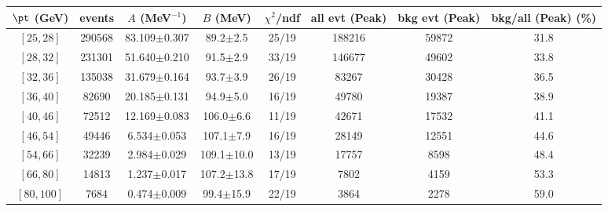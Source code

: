\begin{tabular}{c|c||c|c|c||c|c|c}
$\pt$ (GeV) & events & $A$ (MeV$^{-1}$) & $B$ (MeV)  & $\chi^2$/ndf & all evt (Peak) & bkg evt (Peak) & bkg/all (Peak) (\%)\\
\hline
$[25, 28]$ & 290568 & 83.109$\pm$0.307 & 89.2$\pm$2.5 & 25/19 & 188216 & 59872 & 31.8  \\
$[28, 32]$ & 231301 & 51.640$\pm$0.210 & 91.5$\pm$2.9 & 33/19 & 146677 & 49602 & 33.8  \\
$[32, 36]$ & 135038 & 31.679$\pm$0.164 & 93.7$\pm$3.9 & 26/19 & 83267 & 30428 & 36.5  \\
$[36, 40]$ & 82690 & 20.185$\pm$0.131 & 94.9$\pm$5.0 & 16/19 & 49780 & 19387 & 38.9  \\
$[40, 46]$ & 72512 & 12.169$\pm$0.083 & 106.0$\pm$6.6 & 11/19 & 42671 & 17532 & 41.1  \\
$[46, 54]$ & 49446 & 6.534$\pm$0.053 & 107.1$\pm$7.9 & 16/19 & 28149 & 12551 & 44.6  \\
$[54, 66]$ & 32239 & 2.984$\pm$0.029 & 109.1$\pm$10.0 & 13/19 & 17757 & 8598 & 48.4  \\
$[66, 80]$ & 14813 & 1.237$\pm$0.017 & 107.2$\pm$13.8 & 17/19 & 7802 & 4159 & 53.3  \\
$[80, 100]$ & 7684 & 0.474$\pm$0.009 & 99.4$\pm$15.9 & 22/19 & 3864 & 2278 & 59.0  \\
\end{tabular}

